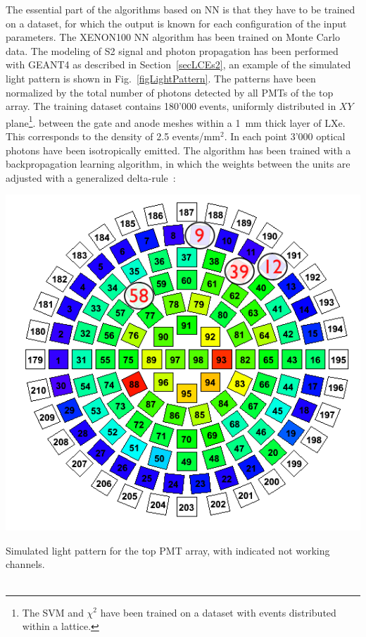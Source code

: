 The essential part of the algorithms based on NN is that they have to be trained on a dataset, for which the output is known for each configuration of the input parameters. The XENON100 NN algorithm has been trained on Monte Carlo data. The modeling of S2 signal and photon propagation has been performed with GEANT4 as described in Section~\ref{secLCEs2}, an example of the simulated light pattern is shown in Fig.~\ref{figLightPattern}. The patterns have been normalized by the total number of photons detected by all PMTs of the top array. 
The training dataset contains 180'000 events, uniformly distributed in $XY$ plane\footnote{The SVM and $\chi^{2}$ have been trained on a dataset with events distributed within a lattice.}. between the gate and anode meshes within a 1~mm thick layer of LXe. This corresponds to the density of 2.5 events/mm$^{2}$. In each point 3'000 optical photons have been isotropically emitted. 
The algorithm has been trained with a backpropagation learning algorithm, in which the weights between the units are adjusted with a generalized delta-rule~\cite{DeltaRule}:

\begin{floatingfigure}[l]{0.4\textwidth}
\centering
\includegraphics[width=0.4\linewidth]{plots/NN/TopLightPattern_withDeadPMTs.png}
\caption[Simulated light pattern for the top PMT array, with indicated not working channels]{Simulated light pattern for the top PMT array, with indicated not working channels.\\ \\}
\label{figLightPattern}
\end{floatingfigure}

